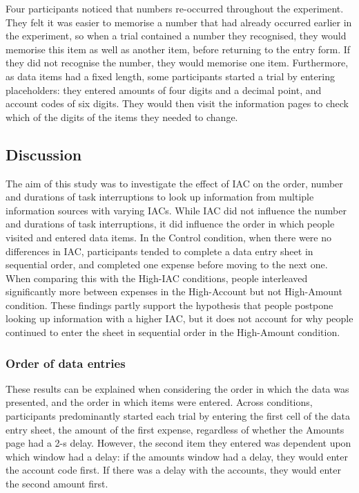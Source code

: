 Four participants noticed that numbers re-occurred throughout the experiment. They felt it was easier to memorise a number that had already occurred earlier in the experiment, so when a trial contained a number they recognised, they would memorise this item as well as another item, before returning to the entry form. If they did not recognise the number, they would memorise one item. Furthermore, as data items had a fixed length, some participants started a trial by entering placeholders: they entered amounts of four digits and a decimal point, and account codes of six digits. They would then visit the information pages to check which of the digits of the items they needed to change. 

\subsection{Discussion}
The aim of this study was to investigate the effect of IAC on the order, number and durations of task interruptions to look up information from multiple information sources with varying IACs. While IAC did not influence the number and durations of task interruptions, it did  influence the order in which people visited and entered data items. 
In the Control condition, when there were no differences in IAC, participants tended to complete a data entry sheet in sequential order, and completed one expense before moving to the next one. When comparing this with the High-IAC conditions, people interleaved significantly more between expenses in the High-Account but not High-Amount condition. These findings partly support the hypothesis that people postpone looking up information with a higher IAC, but it does not account for why people continued to enter the sheet in sequential order in the High-Amount condition. 

\subsubsection{Order of data entries}
These results can be explained when considering the order in which the data was presented, and the order in which items were entered. Across conditions, participants predominantly started each trial by entering the first cell of the data entry sheet, the amount of the first expense, regardless of whether the Amounts page had a 2-s delay. However, the second item they entered was dependent upon which window had a delay: if the amounts window had a delay, they would enter the account code first. If there was a delay with the accounts, they would enter the second amount first.

